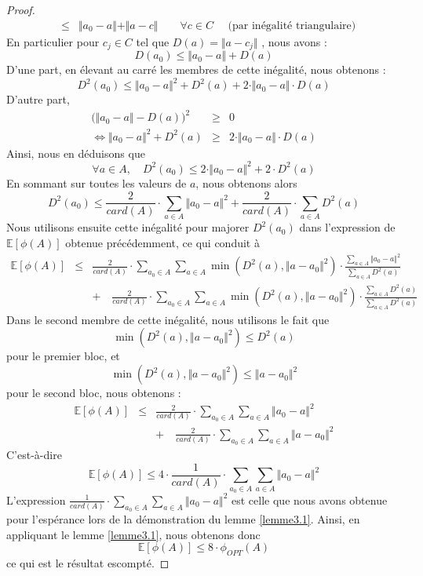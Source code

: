 \documentclass[12pt,a4paper]{book}
\newcommand{\E}{\mathbb{E}}
\newcommand{\1}{\mathds{1}}
\begin{document}
\begin{proof}
\begin{eqnarray*}
			& \leq & \Vert a_0 - a \Vert + \Vert a - c \Vert \qquad \forall c \in C \quad \textrm{ (par inégalité triangulaire)}
		\end{eqnarray*}
		En particulier pour $c_j \in C$ tel que $D(a) = \Vert a - c_j \Vert$ , nous avons :
		$$
			D(a_0) \leq \Vert a_0 - a \Vert + D(a)
		$$
		D'une part, en élevant au carré les membres de cette inégalité, nous obtenons :
		$$
			D^2(a_0) \leq \Vert a_0 - a \Vert^2 + D^2(a) + 2 \cdot \Vert a_0 - a \Vert \cdot D(a)
		$$
		D'autre part,
		\begin{eqnarray*}
			\bigg( \Vert a_0 - a \Vert - D(a)\bigg)^2 & \geq & 0 \\
			\Leftrightarrow \Vert a_0 - a \Vert^2 + D^2(a) & \geq & 2 \cdot \Vert a_0 - a \Vert \cdot D(a)
		\end{eqnarray*}
		Ainsi, nous en déduisons  que
		$$
			\forall a \in A, \quad D^2(a_0) \leq 2 \cdot \Vert a_0 - a \Vert^2 + 2 \cdot D^2(a)
		$$
		En sommant sur toutes les valeurs de $a$, nous obtenons alors 
		$$
			D^2(a_0) \leq \frac{2}{card(A)} \cdot \sum_{a \in A} \Vert a_0 - a \Vert^2 + \frac{2}{card(A)} \cdot \sum_{a \in A} D^2(a)
		$$
		Nous utilisons ensuite cette inégalité pour majorer $D^2(a_0)$ dans l'expression de $\E\left[\phi(A)\right]$ obtenue précédemment, ce qui conduit à 
		\begin{eqnarray*}
			\E\left[\phi(A)\right] & \leq & \frac{2}{card(A)} \cdot \sum_{a_0 \in A} \sum_{a \in A} \min \left( D^2(a), \Vert a-a_0 \Vert^2 \right) \cdot \frac{\sum_{a \in A} \Vert a_0 - a \Vert^2}{ \sum_{a \in A} D^2(a)} \\
			&& + \quad \frac{2}{card(A)} \cdot \sum_{a_0 \in A} \sum_{a \in A} \min \left( D^2(a), \Vert a-a_0 \Vert^2 \right) \cdot \frac{\sum_{a \in A} D^2(a)}{ \sum_{a \in A} D^2(a)} 
		\end{eqnarray*}
		Dans le second membre de cette inégalité, nous utilisons le fait que 
		$$
			\min \left( D^2(a), \Vert a-a_0 \Vert^2 \right) \leq D^2(a)
		$$
		pour le premier bloc, et 
		$$
			\min \left( D^2(a), \Vert a-a_0 \Vert^2 \right) \leq \Vert a-a_0 \Vert^2
		$$
		pour le second bloc, nous obtenons :
		\begin{eqnarray*}
			\E\left[\phi(A)\right] & \leq & \frac{2}{card(A)} \cdot \sum_{a_0 \in A} \sum_{a \in A} \Vert a_0 - a \Vert^2 \\
			&& + \quad \frac{2}{card(A)} \cdot \sum_{a_0 \in A} \sum_{a \in A} \Vert a-a_0 \Vert^2
		\end{eqnarray*}
		C'est-à-dire 
		$$
			\E\left[\phi(A)\right] \leq 4 \cdot \frac{1}{card(A)} \cdot \sum_{a_0 \in A} \sum_{a \in A} \Vert a_0 - a \Vert^2
		$$
		L'expression $\frac{1}{card(A)} \cdot \sum_{a_0 \in A} \sum_{a \in A} \Vert a_0 - a \Vert^2$ est celle que nous avons obtenue pour l'espérance lors de la démonstration du lemme \ref{lemme3.1}. Ainsi, en appliquant le lemme \ref{lemme3.1}, nous obtenons donc
		$$
			\E\left[\phi(A)\right] \leq 8 \cdot \phi_{OPT} \left( A \right)
		$$
		ce qui est le résultat escompté.
	\end{proof}
	
\end{document}
